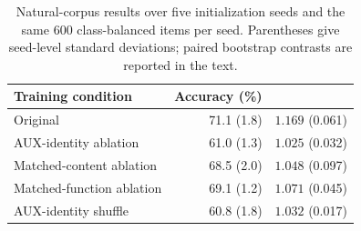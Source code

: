 \begin{table}[t]
\centering
\small
\setlength{\tabcolsep}{3pt}
\begin{tabular}{lrr}
\toprule
Training condition & Accuracy (\%) & \cps{} \\
\midrule
Original & 71.1 (1.8) & $1.169$ (0.061) \\
AUX-identity ablation & 61.0 (1.3) & $1.025$ (0.032) \\
Matched-content ablation & 68.5 (2.0) & $1.048$ (0.097) \\
Matched-function ablation & 69.1 (1.2) & $1.071$ (0.045) \\
AUX-identity shuffle & 60.8 (1.8) & $1.032$ (0.017) \\
\bottomrule
\end{tabular}
\caption{Natural-corpus results over five initialization seeds and the same 600 class-balanced items per seed. Parentheses give seed-level standard deviations; paired bootstrap contrasts are reported in the text.}
\label{tab:confirmatory}
\end{table}
